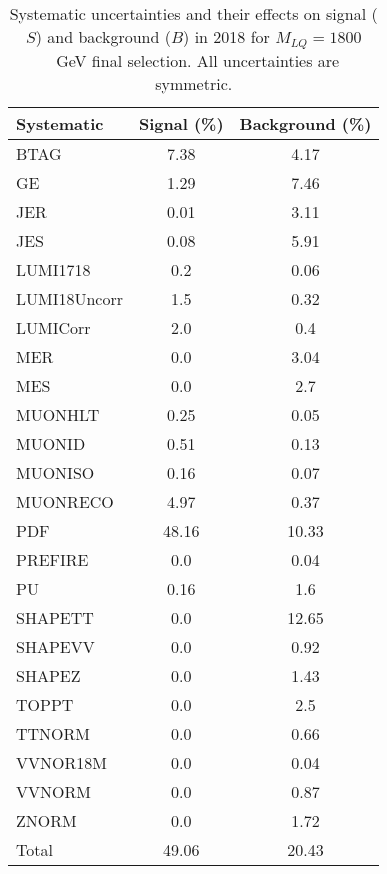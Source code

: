 \begin{table}[htbp]
\begin{center}
\caption{Systematic uncertainties and their effects on signal ($S$) and background ($B$) in 2018 for $M_{LQ}=1800$~GeV final selection. All uncertainties are symmetric.}
\begin{tabular}{lcc}
\hline\hline
Systematic & Signal (\%) & Background (\%) \\ \hline 
BTAG & 7.38 & 4.17\\ 
GE & 1.29 & 7.46\\ 
JER & 0.01 & 3.11\\ 
JES & 0.08 & 5.91\\ 
LUMI1718 & 0.2 & 0.06\\ 
LUMI18Uncorr & 1.5 & 0.32\\ 
LUMICorr & 2.0 & 0.4\\ 
MER & 0.0 & 3.04\\ 
MES & 0.0 & 2.7\\ 
MUONHLT & 0.25 & 0.05\\ 
MUONID & 0.51 & 0.13\\ 
MUONISO & 0.16 & 0.07\\ 
MUONRECO & 4.97 & 0.37\\ 
PDF & 48.16 & 10.33\\ 
PREFIRE & 0.0 & 0.04\\ 
PU & 0.16 & 1.6\\ 
SHAPETT & 0.0 & 12.65\\ 
SHAPEVV & 0.0 & 0.92\\ 
SHAPEZ & 0.0 & 1.43\\ 
TOPPT & 0.0 & 2.5\\ 
TTNORM & 0.0 & 0.66\\ 
VVNOR18M & 0.0 & 0.04\\ 
VVNORM & 0.0 & 0.87\\ 
ZNORM & 0.0 & 1.72\\ 
Total & 49.06 & 20.43\\ \hline \hline
\end{tabular}
\label{tab:SysUncertainties_uujj_1800}
\end{center}
\end{table}

